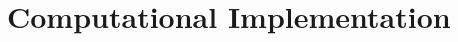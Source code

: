 \documentclass[../main-notes.tex]{subfiles}
\begin{document}
\section{Computational Implementation}

\end{document}
